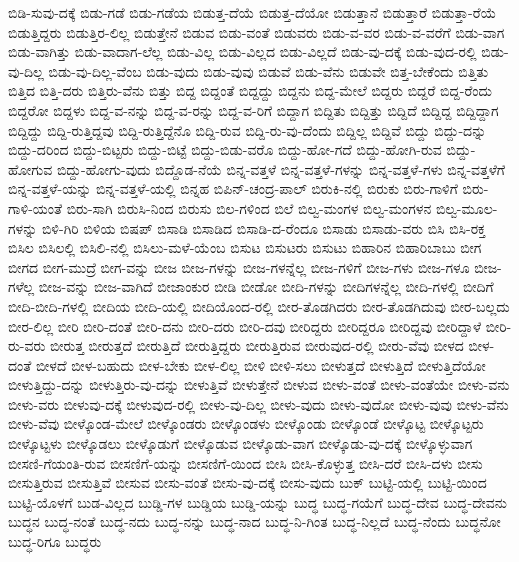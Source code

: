 {ಬಿಡಿ-ಸುವು-ದಕ್ಕೆ
ಬಿಡು-ಗಡೆ
ಬಿಡು-ಗಡೆಯ
ಬಿಡುತ್ತ-ದೆಯೆ
ಬಿಡುತ್ತ-ದೆಯೋ
ಬಿಡುತ್ತಾನೆ
ಬಿಡುತ್ತಾರೆ
ಬಿಡುತ್ತಾ-ರೆಯೆ
ಬಿಡುತ್ತಿದ್ದರು
ಬಿಡುತ್ತಿರ-ಲಿಲ್ಲ
ಬಿಡುತ್ತೇನೆ
ಬಿಡುವ
ಬಿಡು-ವಂತೆ
ಬಿಡುವರು
ಬಿಡು-ವ-ವರ
ಬಿಡು-ವ-ವರೆಗೆ
ಬಿಡು-ವಾಗ
ಬಿಡು-ವಾಗಿತ್ತು
ಬಿಡು-ವಾದಾಗ-ಲೆಲ್ಲ
ಬಿಡು-ವಿಲ್ಲ
ಬಿಡು-ವಿಲ್ಲದ
ಬಿಡು-ವಿಲ್ಲದೆ
ಬಿಡು-ವು-ದಕ್ಕೆ
ಬಿಡು-ವುದ-ರಲ್ಲಿ
ಬಿಡು-ವು-ದಿಲ್ಲ
ಬಿಡು-ವು-ದಿಲ್ಲ-ವೆಂಬ
ಬಿಡು-ವುದು
ಬಿಡು-ವುವು
ಬಿಡುವೆ
ಬಿಡು-ವೆನು
ಬಿಡುವೇ
ಬಿತ್ತ-ಬೇಕೆಂದು
ಬಿತ್ತಿತು
ಬಿತ್ತಿದ
ಬಿತ್ತಿ-ದರು
ಬಿತ್ತಿರು-ವೆನು
ಬಿತ್ತು
ಬಿದ್ದ
ಬಿದ್ದಂತೆ
ಬಿದ್ದದ್ದು
ಬಿದ್ದನು
ಬಿದ್ದ-ಮೇಲೆ
ಬಿದ್ದರು
ಬಿದ್ದರೆ
ಬಿದ್ದ-ರೆಂದು
ಬಿದ್ದರೋ
ಬಿದ್ದಳು
ಬಿದ್ದ-ವ-ನನ್ನು
ಬಿದ್ದ-ವ-ರನ್ನು
ಬಿದ್ದ-ವ-ರಿಗೆ
ಬಿದ್ದಾಗ
ಬಿದ್ದಿತು
ಬಿದ್ದಿತ್ತು
ಬಿದ್ದಿದೆ
ಬಿದ್ದಿದ್ದ
ಬಿದ್ದಿದ್ದಾಗ
ಬಿದ್ದಿದ್ದು
ಬಿದ್ದಿ-ರುತ್ತಿದ್ದವು
ಬಿದ್ದಿ-ರುತ್ತಿದ್ದೆನೊ
ಬಿದ್ದಿ-ರುವ
ಬಿದ್ದಿ-ರು-ವು-ದೆಂದು
ಬಿದ್ದಿಲ್ಲ
ಬಿದ್ದಿವೆ
ಬಿದ್ದು
ಬಿದ್ದು-ದನ್ನು
ಬಿದ್ದು-ದರಿಂದ
ಬಿದ್ದು-ಬಿಟ್ಟರು
ಬಿದ್ದು-ಬಿಟ್ಟೆ
ಬಿದ್ದು-ಬಿಡು-ವರೊ
ಬಿದ್ದು-ಹೋ-ಗದೆ
ಬಿದ್ದು-ಹೋಗಿ-ರುವ
ಬಿದ್ದು-ಹೋಗುವ
ಬಿದ್ದು-ಹೋಗು-ವುದು
ಬಿದ್ದೊಡ-ನೆಯೆ
ಬಿನ್ನ-ವತ್ತಳೆ
ಬಿನ್ನ-ವತ್ತಳೆ-ಗಳನ್ನು
ಬಿನ್ನ-ವತ್ತಳೆ-ಗಳು
ಬಿನ್ನ-ವತ್ತಳೆಗೆ
ಬಿನ್ನ-ವತ್ತಳೆ-ಯನ್ನು
ಬಿನ್ನ-ವತ್ತಳೆ-ಯಲ್ಲಿ
ಬಿನ್ನಹ
ಬಿಪಿನ್-ಚಂದ್ರ-ಪಾಲ್
ಬಿರುಕಿ-ನಲ್ಲಿ
ಬಿರುಕು
ಬಿರು-ಗಾಳಿಗೆ
ಬಿರು-ಗಾಳಿ-ಯಂತೆ
ಬಿರು-ಸಾಗಿ
ಬಿರುಸಿ-ನಿಂದ
ಬಿರುಸು
ಬಿಲ-ಗಳಿಂದ
ಬಿಲೆ
ಬಿಲ್ವ-ಮಂಗಳ
ಬಿಲ್ವ-ಮಂಗಳನ
ಬಿಲ್ವ-ಮೂಲ-ಗಳನ್ನು
ಬಿಳಿ-ಗಿರಿ
ಬಿಳಿಯ
ಬಿಷಪ್
ಬಿಸಾಡಿ
ಬಿಸಾಡಿದ
ಬಿಸಾಡಿ-ದ-ರೆಂದೂ
ಬಿಸಾಡು
ಬಿಸಾಡು-ವರು
ಬಿಸಿ
ಬಿಸಿ-ರಕ್ತ
ಬಿಸಿಲ
ಬಿಸಿಲಲ್ಲಿ
ಬಿಸಿಲಿ-ನಲ್ಲಿ
ಬಿಸಿಲು-ಮಳೆ-ಯೆಂಬ
ಬಿಸುಟ
ಬಿಸುಟರು
ಬಿಸುಟು
ಬಿಹಾರಿನ
ಬಿಹಾರಿಬಾಬು
ಬೀಗ
ಬೀಗದ
ಬೀಗ-ಮುದ್ರೆ
ಬೀಗ-ವನ್ನು
ಬೀಜ
ಬೀಜ-ಗಳನ್ನು
ಬೀಜ-ಗಳನ್ನೆಲ್ಲ
ಬೀಜ-ಗಳಿಗೆ
ಬೀಜ-ಗಳು
ಬೀಜ-ಗಳೂ
ಬೀಜ-ಗಳೆಲ್ಲ
ಬೀಜ-ವನ್ನು
ಬೀಜ-ವಾಗಿದೆ
ಬೀಜಾಂಕುರ
ಬೀಡಿ
ಬೀಡೋ
ಬೀದಿ-ಗಳನ್ನು
ಬೀದಿಗಳನ್ನೆಲ್ಲ
ಬೀದಿ-ಗಳಲ್ಲಿ
ಬೀದಿಗೆ
ಬೀದಿ-ಬೀದಿ-ಗಳಲ್ಲಿ
ಬೀದಿಯ
ಬೀದಿ-ಯಲ್ಲಿ
ಬೀದಿಯೊಂದ-ರಲ್ಲಿ
ಬೀರ-ತೊಡಗಿದರು
ಬೀರ-ತೊಡಗಿದುವು
ಬೀರ-ಬಲ್ಲದು
ಬೀರ-ಲಿಲ್ಲ
ಬೀರಿ
ಬೀರಿ-ದಂತೆ
ಬೀರಿ-ದನು
ಬೀರಿ-ದರು
ಬೀರಿ-ದವು
ಬೀರಿದ್ದರು
ಬೀರಿದ್ದರೂ
ಬೀರಿದ್ದವು
ಬೀರಿದ್ದಾಳೆ
ಬೀರಿ-ರು-ವರು
ಬೀರುತ್ತ
ಬೀರುತ್ತದೆ
ಬೀರುತ್ತಿದೆ
ಬೀರುತ್ತಿದ್ದರು
ಬೀರುತ್ತಿರುವ
ಬೀರುವುದ-ರಲ್ಲಿ
ಬೀರು-ವೆವು
ಬೀಳದ
ಬೀಳ-ದಂತೆ
ಬೀಳದೆ
ಬೀಳ-ಬಹುದು
ಬೀಳ-ಬೇಕು
ಬೀಳ-ಲಿಲ್ಲ
ಬೀಳಿ
ಬೀಳಿ-ಸಲು
ಬೀಳುತ್ತದೆ
ಬೀಳುತ್ತಿದೆ
ಬೀಳುತ್ತಿದೆಯೋ
ಬೀಳುತ್ತಿದ್ದು-ದನ್ನು
ಬೀಳುತ್ತಿರು-ವು-ದನ್ನು
ಬೀಳುತ್ತಿವೆ
ಬೀಳುತ್ತೇನೆ
ಬೀಳುವ
ಬೀಳು-ವಂತೆ
ಬೀಳು-ವಂತೆಯೇ
ಬೀಳು-ವನು
ಬೀಳು-ವರು
ಬೀಳುವು-ದಕ್ಕೆ
ಬೀಳುವುದ-ರಲ್ಲಿ
ಬೀಳು-ವು-ದಿಲ್ಲ
ಬೀಳು-ವುದು
ಬೀಳು-ವುದೋ
ಬೀಳು-ವುವು
ಬೀಳು-ವೆನು
ಬೀಳು-ವೆವು
ಬೀಳ್ಕೊಂಡ-ಮೇಲೆ
ಬೀಳ್ಕೊಂಡರು
ಬೀಳ್ಕೊಂಡಳು
ಬೀಳ್ಕೊಂಡು
ಬೀಳ್ಕೊಂಡೆ
ಬೀಳ್ಕೊಟ್ಟ
ಬೀಳ್ಕೊಟ್ಟರು
ಬೀಳ್ಕೊಟ್ಟಳು
ಬೀಳ್ಕೊಡಲು
ಬೀಳ್ಕೊಡುಗೆ
ಬೀಳ್ಕೊಡುವ
ಬೀಳ್ಕೊಡು-ವಾಗ
ಬೀಳ್ಕೊಡು-ವು-ದಕ್ಕೆ
ಬೀಳ್ಕೊಳ್ಳುವಾಗ
ಬೀಸಣಿ-ಗೆಯಂತಿ-ರುವ
ಬೀಸಣಿಗೆ-ಯನ್ನು
ಬೀಸಣಿಗೆ-ಯಿಂದ
ಬೀಸಿ
ಬೀಸಿ-ಕೊಳ್ಳುತ್ತ
ಬೀಸಿ-ದರೆ
ಬೀಸಿ-ದಳು
ಬೀಸು
ಬೀಸುತ್ತಿರುವ
ಬೀಸುತ್ತಿವೆ
ಬೀಸುವ
ಬೀಸು-ವಂತೆ
ಬೀಸು-ವು-ದಕ್ಕೆ
ಬೀಸು-ವುದು
ಬುಕ್
ಬುಟ್ಟಿ-ಯಲ್ಲಿ
ಬುಟ್ಟಿ-ಯಿಂದ
ಬುಟ್ಟಿ-ಯೊಳಗೆ
ಬುಡ-ವಿಲ್ಲದ
ಬುಡ್ಡಿ-ಗಳ
ಬುಡ್ಡಿಯ
ಬುಡ್ಡಿ-ಯನ್ನು
ಬುದ್ಧ
ಬುದ್ಧ-ಗಯೆಗೆ
ಬುದ್ಧ-ದೇವ
ಬುದ್ಧ-ದೇವನು
ಬುದ್ಧನ
ಬುದ್ಧ-ನಂತೆ
ಬುದ್ಧ-ನದು
ಬುದ್ಧ-ನನ್ನು
ಬುದ್ಧ-ನಾದ
ಬುದ್ಧ-ನಿ-ಗಿಂತ
ಬುದ್ಧ-ನಿಲ್ಲದೆ
ಬುದ್ಧ-ನೆಂದು
ಬುದ್ಧನೋ
ಬುದ್ಧ-ರಿಗೂ
ಬುದ್ಧರು
}
